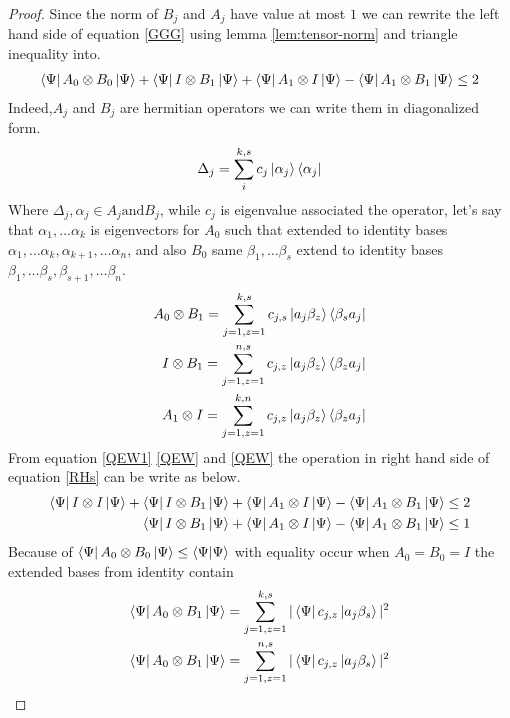 \begin{proof}

Since the norm of $B_j$ and $A_j$  have value  at most $1$ we can rewrite the left hand side of equation  \ref{GGG} using lemma \ref{lem:tensor-norm}  and triangle inequality into. 
\begin{align}\label{RHs}
 \bra{\Psi}A_0\otimes B_0\ket{\Psi}+ \bra{\Psi} I\otimes B_1\ket{\Psi}+ \bra{\Psi}A_1\otimes I\ket{\Psi}-  \bra{\Psi}A_1\otimes B_1 \ket{\Psi} \leq 2
\end{align}
 Indeed,$A_j$ and $B_j$ are hermitian operators we can write them in diagonalized form. 
$$\Delta_{j}=\sum_{i}^{k,s}c_j \ket{\alpha_j}\bra{\alpha_j}$$
Where $\Delta_{j},\alpha_j \in A_j \text{and} B_j$, while $c_j$ is eigenvalue associated the operator, let's say that  $\alpha_1,\dots \alpha_k$ is eigenvectors for $A_0$ such that extended to identity bases $\alpha_1,\dots \alpha_k,\alpha_{k+1},\dots \alpha_{n}$,
and also  $B_0$ same $\beta_1,\dots \beta_s$ extend to identity bases $\beta_1,\dots \beta_s,\beta_{s+1},\dots \beta_n$. 
\begin{align}
A_0 \otimes B_1=\sum_{j=1,z=1}^{k,s}c_{j,s}\ket{a_j\beta _z} \bra{\beta_s a_j }\label{QEW}\\
I \otimes B_1=\sum_{j=1,z=1}^{n,s}c_{j,z}\ket{a_j\beta _z} \bra{\beta_z a_j }\label{QEW1}\\
A_1 \otimes I=\sum_{j=1,z=1}^{k,n}c_{j,z}\ket{a_j\beta _z} \bra{\beta_z a_j }\label{QEW2}
\end{align}
From equation \ref{QEW1}  \ref{QEW} and \ref{QEW} the operation in right hand  side of  equation  \ref{RHs} can be write as below.
\begin{align}\label{NAND:TINEQ}
\bra{\Psi} I\otimes I\ket{\Psi}+\bra{\Psi}I\otimes B_1\ket{\Psi}+\bra{\Psi}A_1\otimes I\ket{\Psi}-\bra{\Psi}A_1\otimes B_1 \ket{\Psi} \leq 2\\
\bra{\Psi}I\otimes B_1\ket{\Psi}+\bra{\Psi}A_1\otimes I\ket{\Psi}-\bra{\Psi}A_1\otimes B_1 \ket{\Psi} \leq 1
\end{align}
Because of $\bra{\Psi} A_0\otimes B_0\ket{\Psi} \leq \bra {\Psi} \ket{\Psi}$ with equality occur when $A_0=B_0=I$ the extended bases from identity contain  
\begin{align*}
\bra{\Psi} A_0\otimes B_1\ket{\Psi}=\sum_{j=1,z=1}^{k,s}|\bra{\Psi}c_{j,z}\ket{a_j\beta _s}|^2\\
\bra{\Psi} A_0\otimes B_1\ket{\Psi}=\sum_{j=1,z=1}^{n,s}|\bra{\Psi}c_{j,z}\ket{a_j\beta _s}|^2
\end{align*}


\end{proof}
